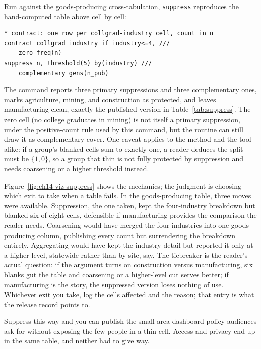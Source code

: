 Run against the goods-producing cross-tabulation, \texttt{suppress} reproduces the hand-computed table above cell by cell:
\par
{\footnotesize
\begin{verbatim}
* contract: one row per collgrad-industry cell, count in n
contract collgrad industry if industry<=4, ///
    zero freq(n)
suppress n, threshold(5) by(industry) ///
    complementary gens(n_pub)
\end{verbatim}
}
The command reports three primary suppressions and three complementary ones, marks agriculture, mining, and construction as protected, and leaves manufacturing clean, exactly the published version in Table~\ref{tab:suppress}. The zero cell (no college graduates in mining) is not itself a primary suppression, under the positive-count rule used by this command, but the routine can still draw it as complementary cover. One caveat applies to the method and the tool alike: if a group's blanked cells sum to exactly one, a reader deduces the split must be $\{1,0\}$, so a group that thin is not fully protected by suppression and needs coarsening or a higher threshold instead.

Figure~\ref{fig:ch14-viz-suppress} shows the mechanics; the judgment is choosing which exit to take when a table fails. In the goods-producing table, three moves were available. Suppression, the one taken, kept the four-industry breakdown but blanked six of eight cells, defensible if manufacturing provides the comparison the reader needs. Coarsening would have merged the four industries into one goods-producing column, publishing every count but surrendering the breakdown entirely. Aggregating would have kept the industry detail but reported it only at a higher level, statewide rather than by site, say. The tiebreaker is the reader's actual question: if the argument turns on construction versus manufacturing, six blanks gut the table and coarsening or a higher-level cut serves better; if manufacturing is the story, the suppressed version loses nothing of use. Whichever exit you take, log the cells affected and the reason; that entry is what the release record points to.

Suppress this way and you can publish the small-area dashboard policy audiences ask for without exposing the few people in a thin cell. Access and privacy end up in the same table, and neither had to give way.

